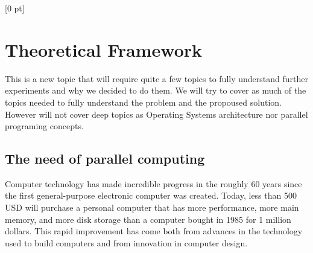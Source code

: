 \titlespacing{\chapter}{0 pt}{30 pt}{50 pt}[0 pt]
\titleformat{\section}{\Large\bfseries}{\thesection}{0 pt}{\hspace{30 pt}}
\titleformat{\subsection}{\large\bfseries}{\thesubsection}{0 pt}{\hspace{30 pt}}
\pagestyle{fancy}
\fancyhead[LO,LE]{\footnotesize\emph{\leftmark}}
\fancyhead[RO,RE]{\thepage}
\fancyfoot[CO,CE]{}

\chapter{Theoretical Framework}

\normalsize
\noindent

This is a new topic that will require quite a few topics to fully understand
further experiments and why we decided to do them. We will try to cover as much
of the topics needed to fully understand the problem and the propoused
solution. However will not cover deep topics as Operating Systems architecture
nor parallel programing concepts.


\section{The need of parallel computing}
\noindent

Computer technology has made incredible progress in the roughly 60 years since
the first general-purpose electronic computer was created. Today, less than 500
USD will purchase a personal computer that has more performance, more main
memory, and more disk storage than a computer bought in 1985 for 1 million
dollars. This rapid improvement has come both from advances in the technology
used to build computers and from innovation in computer design. \cite{Hennessy}

